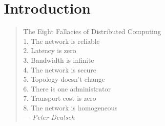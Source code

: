 \chapter{Introduction}



\begin{quote}
The Eight Fallacies of Distributed Computing\\
 1. The network is reliable\\
 2. Latency is zero\\
 3. Bandwidth is infinite\\
 4. The network is secure\\
 5. Topology doesn't change\\
 6. There is one administrator\\
 7. Transport cost is zero\\
 8. The network is homogeneous\\
--- \emph{Peter Deutsch}
\end{quote}


